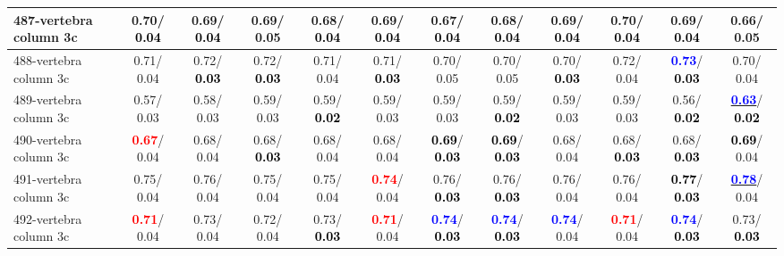 \begin{table}[h]
\begin{center}
{\begin{tabular}{lc|c|c|c|c|c|c|c|c|c|c}
487-vertebra column 3c &   0.70/\textcolor{black}{\textbf{  0.04}} &   0.69/\textcolor{black}{\textbf{  0.04}} &   0.69/  0.05 &   0.68/\textcolor{black}{\textbf{  0.04}} &   0.69/\textcolor{black}{\textbf{  0.04}} &   0.67/\textcolor{black}{\textbf{  0.04}} &   0.68/\textcolor{black}{\textbf{  0.04}} &   0.69/\textcolor{black}{\textbf{  0.04}} &   0.70/\textcolor{black}{\textbf{  0.04}} &   0.69/\textcolor{black}{\textbf{  0.04}} &   0.66/  0.05 \\ \hline
488-vertebra column 3c &   0.71/  0.04 &   0.72/\textcolor{black}{\textbf{  0.03}} &   0.72/\textcolor{black}{\textbf{  0.03}} &   0.71/  0.04 &   0.71/\textcolor{black}{\textbf{  0.03}} &   0.70/  0.05 &   0.70/  0.05 &   0.70/\textcolor{black}{\textbf{  0.03}} &   0.72/  0.04 & \textcolor{blue}{\textbf{  0.73}}/\textcolor{black}{\textbf{  0.03}} &   0.70/  0.04 \\
489-vertebra column 3c &   0.57/  0.03 &   0.58/  0.03 &   0.59/  0.03 &   0.59/\textcolor{black}{\textbf{  0.02}} &   0.59/  0.03 &   0.59/  0.03 &   0.59/\textcolor{black}{\textbf{  0.02}} &   0.59/  0.03 &   0.59/  0.03 &   0.56/\textcolor{black}{\textbf{  0.02}} & \underline{\textcolor{blue}{\textbf{  0.63}}}/\textcolor{black}{\textbf{  0.02}} \\
490-vertebra column 3c & \textcolor{red}{\textbf{  0.67}}/  0.04 &   0.68/  0.04 &   0.68/\textcolor{black}{\textbf{  0.03}} &   0.68/  0.04 &   0.68/  0.04 & \textcolor{black}{\textbf{  0.69}}/\textcolor{black}{\textbf{  0.03}} & \textcolor{black}{\textbf{  0.69}}/\textcolor{black}{\textbf{  0.03}} &   0.68/  0.04 &   0.68/\textcolor{black}{\textbf{  0.03}} &   0.68/\textcolor{black}{\textbf{  0.03}} & \textcolor{black}{\textbf{  0.69}}/  0.04 \\
491-vertebra column 3c &   0.75/  0.04 &   0.76/  0.04 &   0.75/  0.04 &   0.75/  0.04 & \textcolor{red}{\textbf{  0.74}}/  0.04 &   0.76/\textcolor{black}{\textbf{  0.03}} &   0.76/\textcolor{black}{\textbf{  0.03}} &   0.76/  0.04 &   0.76/  0.04 & \textcolor{black}{\textbf{  0.77}}/\textcolor{black}{\textbf{  0.03}} & \underline{\textcolor{blue}{\textbf{  0.78}}}/  0.04 \\
492-vertebra column 3c & \textcolor{red}{\textbf{  0.71}}/  0.04 &   0.73/  0.04 &   0.72/  0.04 &   0.73/\textcolor{black}{\textbf{  0.03}} & \textcolor{red}{\textbf{  0.71}}/  0.04 & \textcolor{blue}{\textbf{  0.74}}/\textcolor{black}{\textbf{  0.03}} & \textcolor{blue}{\textbf{  0.74}}/\textcolor{black}{\textbf{  0.03}} & \textcolor{blue}{\textbf{  0.74}}/  0.04 & \textcolor{red}{\textbf{  0.71}}/  0.04 & \textcolor{blue}{\textbf{  0.74}}/\textcolor{black}{\textbf{  0.03}} &   0.73/\textcolor{black}{\textbf{  0.03}} \\

\end{tabular}}
\end{center}
\end{table}
